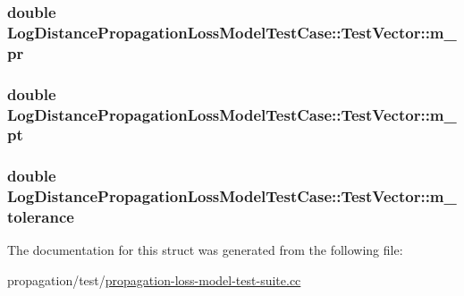 \subsubsection[{\texorpdfstring{m\+\_\+pr}{m_pr}}]{\setlength{\rightskip}{0pt plus 5cm}double Log\+Distance\+Propagation\+Loss\+Model\+Test\+Case\+::\+Test\+Vector\+::m\+\_\+pr}\hypertarget{structLogDistancePropagationLossModelTestCase_1_1TestVector_a987953f6c90485980816eb5d9199fe38}{}\label{structLogDistancePropagationLossModelTestCase_1_1TestVector_a987953f6c90485980816eb5d9199fe38}
\subsubsection[{\texorpdfstring{m\+\_\+pt}{m_pt}}]{\setlength{\rightskip}{0pt plus 5cm}double Log\+Distance\+Propagation\+Loss\+Model\+Test\+Case\+::\+Test\+Vector\+::m\+\_\+pt}\hypertarget{structLogDistancePropagationLossModelTestCase_1_1TestVector_a14279b361ad4258a4021b45fe86a2763}{}\label{structLogDistancePropagationLossModelTestCase_1_1TestVector_a14279b361ad4258a4021b45fe86a2763}
\subsubsection[{\texorpdfstring{m\+\_\+tolerance}{m_tolerance}}]{\setlength{\rightskip}{0pt plus 5cm}double Log\+Distance\+Propagation\+Loss\+Model\+Test\+Case\+::\+Test\+Vector\+::m\+\_\+tolerance}\hypertarget{structLogDistancePropagationLossModelTestCase_1_1TestVector_ab825820b63f5ce850d6a8e197a47d9d2}{}\label{structLogDistancePropagationLossModelTestCase_1_1TestVector_ab825820b63f5ce850d6a8e197a47d9d2}


The documentation for this struct was generated from the following file\+:\begin{DoxyCompactItemize}
\item 
propagation/test/\hyperlink{propagation-loss-model-test-suite_8cc}{propagation-\/loss-\/model-\/test-\/suite.\+cc}\end{DoxyCompactItemize}
